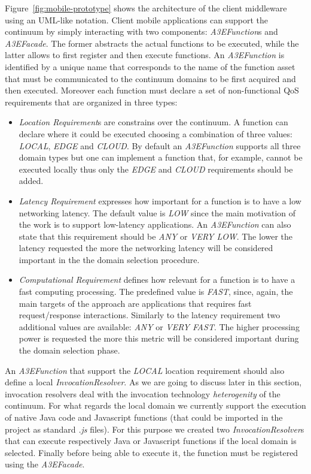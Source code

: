 Figure~\ref{fig:mobile-prototype} shows the architecture of the client middleware using an UML-like notation. Client mobile applications can support the continuum by simply interacting with two components:  \textit{A3EFunction}s and \textit{A3EFacade}. The former abstracts the actual functions to be executed, while the latter allows to first register and then execute functions. An \textit{A3EFunction} is identified by a unique name that corresponds to the name of the function asset that must be communicated to the continuum domains to be first acquired and then executed. Moreover each function must declare a set of non-functional QoS requirements that are organized in three types: 

\begin{itemize}
	\item \textit{Location Requirement}s are constrains over the continuum. A function can declare where it could be executed choosing a combination of three values: \textit{LOCAL}, \textit{EDGE} and \textit{CLOUD}. By default an \textit{A3EFunction} supports all three domain types but one can implement a function that, for example, cannot be executed locally thus only the \textit{EDGE} and \textit{CLOUD} requirements should be added.    
	\item \textit{Latency Requirement} expresses how important for a function is to have a low networking latency. The default value is \textit{LOW} since the main motivation of the work is to support low-latency applications. An \textit{A3EFunction}  can  also state that this requirement should be \textit{ANY} or \textit{VERY LOW}. The lower the latency requested the more the networking latency will be considered important in the the domain selection procedure.
	\item \textit{Computational Requirement} defines how relevant for a function is to have a fast computing processing. The predefined value is \textit{FAST}, since, again, the main targets of the approach are applications that requires fast request/response interactions. Similarly to the latency requirement two additional values are available:  \textit{ANY} or \textit{VERY FAST}. The higher  processing power is requested the more this metric will be considered important during the domain selection phase.
\end{itemize}

An \textit{A3EFunction} that support the \textit{LOCAL} location requirement should also define a local \textit{InvocationResolver}. As we are going to discuss later in this section, invocation resolvers deal with the invocation technology \textit{heterogenity}  of the continuum. For what regards the local domain we currently support the execution of native Java code and Javascript functions (that could be imported in the project as standard \textit{.js} files). For this purpose we created two \textit{InvocationResolver}s that can execute respectively Java or Javascript functions if the local domain is selected.  Finally before being able to execute it, the function must be registered using the \textit{A3EFacade}.


